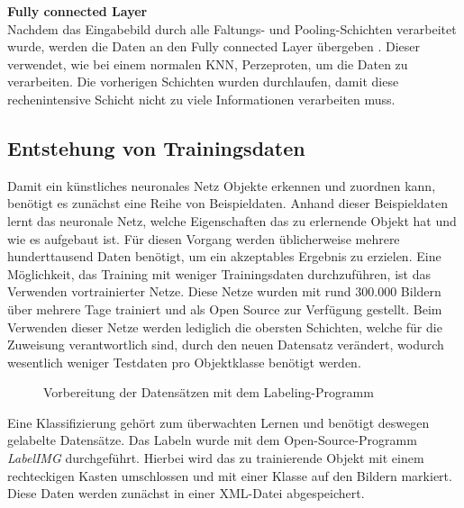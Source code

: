 \textbf{Fully connected Layer}\\
Nachdem das Eingabebild durch alle Faltungs- und Pooling-Schichten verarbeitet wurde, werden die Daten an den Fully connected Layer übergeben \cite[14]{sermanet2012convolutional}. Dieser verwendet, wie bei einem normalen KNN, Perzeproten, um die Daten zu verarbeiten. Die vorherigen Schichten wurden durchlaufen, damit diese rechenintensive Schicht nicht zu viele Informationen verarbeiten muss. 
  \subsection{Entstehung von Trainingsdaten}\label{s.trainingsdaten} 
Damit ein künstliches neuronales Netz Objekte erkennen und zuordnen kann, benötigt es zunächst eine Reihe von Beispieldaten. Anhand dieser Beispieldaten lernt das neuronale Netz, welche Eigenschaften das zu erlernende Objekt hat und wie es aufgebaut ist. Für diesen Vorgang werden üblicherweise mehrere hunderttausend Daten benötigt, um ein akzeptables Ergebnis zu erzielen. Eine Möglichkeit, das Training mit weniger Trainingsdaten durchzuführen, ist das Verwenden vortrainierter Netze. Diese Netze wurden mit rund 300.000 Bildern über mehrere Tage trainiert und als Open Source zur Verfügung gestellt. Beim Verwenden dieser Netze werden lediglich die obersten Schichten, welche für die Zuweisung verantwortlich sind, durch den neuen Datensatz verändert, wodurch wesentlich weniger Testdaten pro Objektklasse benötigt werden. 
\begin{figure}
	[h]
	\centering
	\setlength{\fboxsep}{1pt} 
    \setlength{\fboxrule}{1pt}
	\caption{Vorbereitung der Datensätzen mit dem Labeling-Programm \cite{labelimg2019}}
	\label{img:labelimg}
\end{figure}
Eine Klassifizierung gehört zum überwachten Lernen und benötigt deswegen gelabelte Datensätze. Das Labeln wurde mit dem Open-Source-Programm \textit{LabelIMG} \cite{labelimg2019} durchgeführt. Hierbei wird das zu trainierende Objekt mit einem rechteckigen Kasten umschlossen und mit einer Klasse auf den Bildern markiert. Diese Daten werden zunächst in einer XML-Datei abgespeichert. 
